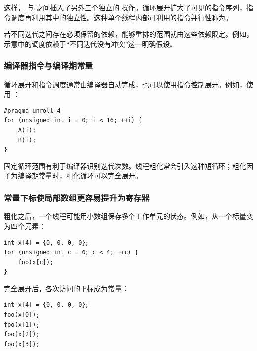 这样， 与  之间插入了另外三个独立的  操作。循环展开扩大了可见的指令序列，指令调度再利用其中的独立性。这种单个线程内部可利用的指令并行性称为。

若不同迭代之间存在必须保留的依赖，能够重排的范围就由这些依赖限定。例如，示意中的调度依赖于“不同迭代没有冲突”这一明确假设。

\subsubsection{编译器指令与编译期常量}
\par\noindent\begin{minipage}{\linewidth}
循环展开和指令调度通常由编译器自动完成，也可以使用指令控制展开。例如，使用 ：

\begin{lstlisting}[caption={使用编译器指令指定展开因子。}]
#pragma unroll 4
for (unsigned int i = 0; i < 16; ++i) {
    A(i);
    B(i);
}
\end{lstlisting}
\end{minipage}\par

固定循环范围有利于编译器识别迭代次数。线程粗化常会引入这种短循环；粗化因子为编译期常量时，粗化循环可以完全展开。

\subsubsection{常量下标使局部数组更容易提升为寄存器}
\par\noindent\begin{minipage}{\linewidth}
粗化之后，一个线程可能用小数组保存多个工作单元的状态。例如，从一个标量变为四个元素：

\begin{lstlisting}[caption={具有变量下标的线程局部数组。}]
int x[4] = {0, 0, 0, 0};
for (unsigned int c = 0; c < 4; ++c) {
    foo(x[c]);
}
\end{lstlisting}
\end{minipage}\par

\par\noindent\begin{minipage}{\linewidth}
完全展开后，各次访问的下标成为常量：

\begin{lstlisting}[caption={展开后各次访问具有固定下标。}]
int x[4] = {0, 0, 0, 0};
foo(x[0]);
foo(x[1]);
foo(x[2]);
foo(x[3]);
\end{lstlisting}
\end{minipage}\par

